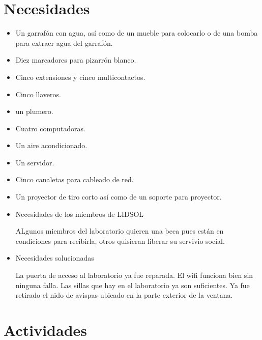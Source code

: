 \documentclass[a4paper,11pt]{article}                 %
\begin{document}
  \section{Necesidades}
  \begin{itemize}
    \item Un garrafón con agua, así como de un mueble para colocarlo o de una bomba para extraer agua del garrafón.

    \item Diez marcadores para pizarrón blanco.

    \item Cinco extensiones y cinco multicontactos.

    \item Cinco llaveros.

    \item un plumero.
    
    \item Cuatro computadoras.
    
    \item Un aire acondicionado.
    
    \item Un servidor.

    \item Cinco canaletas para cableado de red.

    \item Un proyector de tiro corto así como de un soporte para proyector.

    \item Necesidades de los miembros de LIDSOL

    ALgunos miembros del laboratorio quieren una beca pues están en condiciones para recibirla, otros quisieran liberar su servivio social.

    \item Necesidades solucionadas

    La puerta de acceso al laboratorio ya fue reparada. El wifi funciona bien sin ninguna falla. Las sillas que hay en el laboratorio ya son suficientes. Ya fue retirado el nido de avispas ubicado en la parte exterior de la ventana.

  \end{itemize}
  \section{Actividades}
  
  
  
   
  


\end{document}

